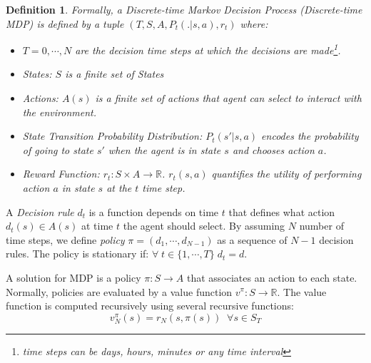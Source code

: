 \documentclass[10pt,journal,compsoc]{IEEEtran}
\newtheorem{definition}{Definition}
\begin{document}
\begin{definition}
Formally, a \emph{Discrete-time Markov Decision Process (Discrete-time MDP)} \cite{timeMDP} is defined by a tuple $(T, S, A, P_t(.|s,a), r_t)$ where:

\begin{itemize}
\item[-] $T=0,\cdots, N$ are the decision time steps at which the decisions are made\footnote{time steps can be days, hours, minutes or any time interval}. 
\item[-]States: $S$ is a finite set of States
\item[-] Actions: $A(s)$ is a finite set of actions that agent can select to interact with the environment.
\item[-] State Transition Probability Distribution: $P_t(s'| s,a)$ encodes the probability of going to state $s'$ when the agent is in state $s$ and chooses action $a$.
\item[-] Reward Function: $r_t : S \times A \longrightarrow \mathbb{R}$. $r_t(s,a)$ quantifies the utility of performing action $a$ in state $s$ at the $t$ time step.
\end{itemize}

\end{definition}

A \emph{Decision rule} $d_t$ is a function depends on time $t$ that defines what action $d_t(s) \in A(s)$ at time $t$ the agent should select. By assuming $N$ number of time steps, we define \emph{policy} $\pi = (d_1, \cdots, d_{N-1})$ as a sequence of $N-1$  decision rules. The policy is stationary if: $\forall \; t \in \{1, \cdots, T \} \; d_t = d$. 

A solution for MDP is a policy $\pi: S \longrightarrow A$ that associates an action to each state. Normally, policies are evaluated by a value function $v^{\pi} : S \longrightarrow \mathbb{R}$. The value function is computed recursively using several recursive functions: %
\begin{equation}
v^{\pi}_N(s) = r_N(s, \pi(s)) \;\; \forall s\in S_T
\end{equation}
\end{document}
